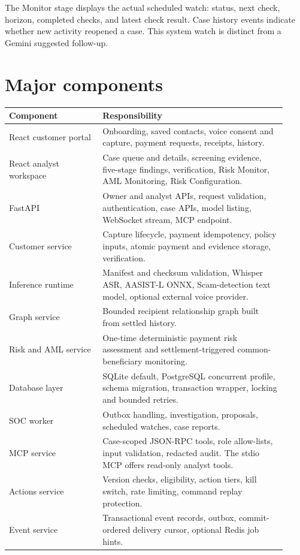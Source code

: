 \documentclass[11pt,a4paper]{article}
\begin{document}
The Monitor stage displays the actual scheduled watch: status, next check, horizon, completed checks, and latest check result. Case history events indicate whether new activity reopened a case. This system watch is distinct from a Gemini suggested follow-up.

\section{Major components}
\begin{longtable}{@{}p{0.31\linewidth}p{0.61\linewidth}@{}}
\toprule
Component & Responsibility \\
\midrule
\endhead
React customer portal & Onboarding, saved contacts, voice consent and capture, payment requests, receipts, history. \\
React analyst workspace & Case queue and details, screening evidence, five-stage findings, verification, Risk Monitor, AML Monitoring, Risk Configuration. \\
FastAPI & Owner and analyst APIs, request validation, authentication, case APIs, model listing, WebSocket stream, MCP endpoint. \\
Customer service & Capture lifecycle, payment idempotency, policy inputs, atomic payment and evidence storage, verification. \\
Inference runtime & Manifest and checksum validation, Whisper ASR, AASIST-L ONNX, Scam-detection text model, optional external voice provider. \\
Graph service & Bounded recipient relationship graph built from settled history. \\
Risk and AML service & One-time deterministic payment risk assessment and settlement-triggered common-beneficiary monitoring. \\
Database layer & SQLite default, PostgreSQL concurrent profile, schema migration, transaction wrapper, locking and bounded retries. \\
SOC worker & Outbox handling, investigation, proposals, scheduled watches, case reports. \\
MCP service & Case-scoped JSON-RPC tools, role allow-lists, input validation, redacted audit. The stdio MCP offers read-only analyst tools. \\
Actions service & Version checks, eligibility, action tiers, kill switch, rate limiting, command replay protection. \\
Event service & Transactional event records, outbox, commit-ordered delivery cursor, optional Redis job hints. \\
\bottomrule
\end{longtable}
\end{document}
